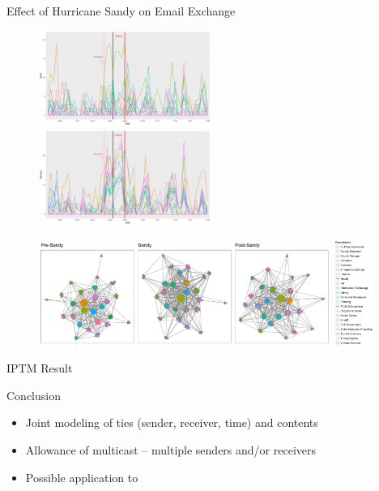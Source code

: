 \documentclass[10pt]{beamer}
\def\bni{\begin{itemize}} \def\ei{\end{itemize}}
\theoremstyle{definition}
\theoremstyle{remark}
\begin{document}
\begin{frame}{Effect of Hurricane Sandy on Email Exchange}
	 	 \begin{figure}
	 	 	\includegraphics[width=0.5\textwidth]{Sendplot2.pdf}	 	
	 	 	\includegraphics[width=0.5\textwidth]{Receiveplot2.pdf}
	 	 \end{figure}	
	 \begin{figure}
	 		 	\includegraphics[width=0.85\textwidth]{Networkplot.pdf}
	 		 	\hspace{0.1cm}
	 		 		 	\includegraphics[width=0.11\textwidth]{Dept2.jpg}
	 \end{figure}	
\end{frame}

\begin{frame}{IPTM Result}
\end{frame}

\begin{frame}{Conclusion}
 \bni
 \item Joint modeling of ties (sender, receiver, time) and contents
 	\vspace{0.4cm}
 \item Allowance of multicast -- multiple senders and/or receivers
 	\vspace{0.4cm}
 \item Possible application to 
 \ei
\end{frame}
\end{document}
